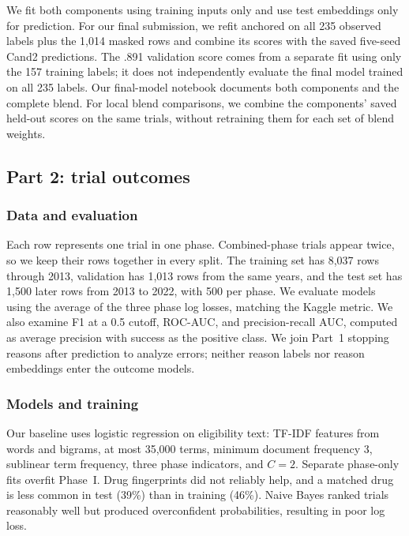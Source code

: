 \documentclass[10pt,twocolumn,letterpaper]{article}
\begin{document}
We fit both components using training inputs only and use test embeddings only
for prediction. For our final submission, we refit anchored on all 235 observed
labels plus the 1,014 masked rows and combine its scores with the saved
five-seed Cand2 predictions. The .891 validation score comes from a separate
fit using only the 157 training labels; it does not independently evaluate the
final model trained on all 235 labels. Our final-model notebook documents both
components and the complete blend.
For local blend comparisons, we combine the components' saved held-out scores
on the same trials, without retraining them for each set of blend weights.

\subsection{Part 2: trial outcomes}
\label{sec:p2}

\subsubsection{Data and evaluation}

Each row represents one trial in one phase. Combined-phase trials appear twice,
so we keep their rows together in every split. The training set has 8,037 rows
through 2013, validation has 1,013 rows from the same years, and the test set
has 1,500 later rows from 2013 to 2022, with 500 per phase. We evaluate models
using the average of the three phase log losses, matching the Kaggle metric.
We also examine F1 at a 0.5 cutoff, ROC-AUC, and precision-recall AUC, computed as average precision with success as the positive
class. We join Part~1 stopping reasons after prediction to analyze errors;
neither reason labels nor reason embeddings enter the outcome models.

\subsubsection{Models and training}

Our baseline uses logistic regression on eligibility text: TF-IDF features from
words and bigrams, at most 35,000 terms, minimum document frequency 3,
sublinear term frequency,
three phase indicators, and $C = 2$. Separate phase-only fits overfit Phase~I.
Drug fingerprints did not reliably help, and a matched drug is less common in
test (39\%) than in training (46\%). Naive Bayes ranked trials reasonably well
but produced overconfident probabilities, resulting in poor log loss.
\end{document}

